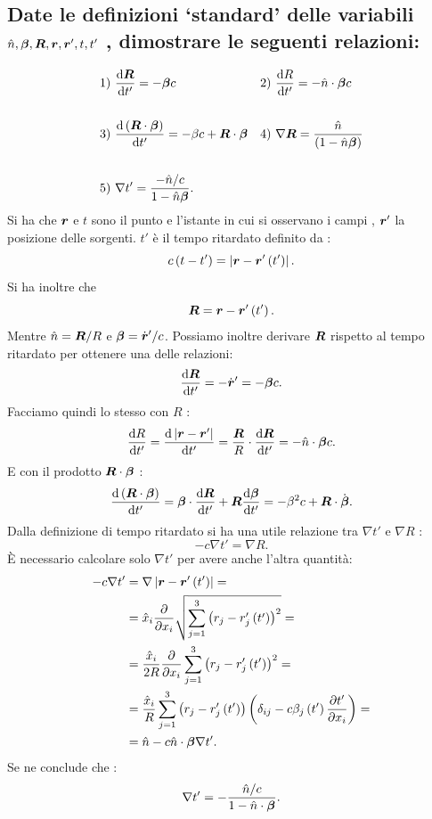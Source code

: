 \subsection[]{Date le definizioni ‘standard’ delle variabili $\hat{n}, \boldsymbol{\beta}, \boldsymbol{R}, \boldsymbol{r}, \boldsymbol{r}', t, t'$ , dimostrare le seguenti relazioni:
} \label{sec:3.b.2}
\begin{align*}
&1) \ \frac{\mbox{d} \bs{R}}{\mbox{d} t'} = -\bs{\beta}c 					&2)& \ \frac{\mbox{d}R}{\mbox{d}t'}=-\hat{n}\cdot\bs{\beta}c\\
& & &\\
&3) \ \frac{\mbox{d}\left(\bs{R}\cdot\bs{\beta}\right)}{\mbox{d}t'}=-\beta c+\bs{R}\cdot\bs{\beta}	&4)& \ \nabla\bs{R}=\frac{\hat{n}}{\left(1-\hat{n}\bs{\beta}\right)}\\
& & &\\
&5) \ \nabla t' = \frac{-\hat{n}/c}{1-\hat{n}\bs{\beta}}
.\end{align*}
Si ha che $\boldsymbol{r}$ e $t$ sono il punto e l'istante in cui si osservano i campi , $\boldsymbol{r}'$ la posizione delle sorgenti. $t'$ è il tempo ritardato definito da : \[
	c\left( t-t' \right) =\left| \boldsymbol{r}- \boldsymbol{r}'\left( t' \right)  \right| 
.\] 
Si ha inoltre che \[
	\boldsymbol{R}= \boldsymbol{r}-\boldsymbol{r}'\left( t' \right) 
.\]
Mentre $\hat{n} = \boldsymbol{R} /R$ e $\boldsymbol{\beta}=\dot{\boldsymbol{r}}' /c$. Possiamo inoltre derivare $\boldsymbol{R}$ rispetto al tempo ritardato per ottenere una delle relazioni: \[
	\frac{\mbox{d} \boldsymbol{R}}{\mbox{d} t'} = -\dot{\boldsymbol{r}}'=-\boldsymbol{\beta}c
.\] 
Facciamo quindi lo stesso con $R$ : \[
	\frac{\mbox{d} R}{\mbox{d} t'} = \frac{\mbox{d} \left| \boldsymbol{r}-\boldsymbol{r}' \right| }{\mbox{d} t'} = 
	\frac{\boldsymbol{R}}{R}\cdot \frac{\mbox{d} \boldsymbol{R}}{\mbox{d} t'}= - \hat{n}\cdot \boldsymbol{\beta}c
.\] 
E con il prodotto $\boldsymbol{R}\cdot \boldsymbol{\beta}$ : \[
	\frac{\mbox{d} \left( \boldsymbol{R}\cdot \boldsymbol{\beta} \right) }{\mbox{d} t'} = \boldsymbol{\beta}\cdot \frac{\mbox{d} \boldsymbol{R}}{\mbox{d} t'} + \boldsymbol{R}\frac{\mbox{d} \boldsymbol{\beta}}{\mbox{d} t'} = -\beta^2c + \boldsymbol{R}\cdot \dot{\boldsymbol{\beta}} 	
.\]
Dalla definizione di tempo ritardato si ha una utile relazione tra $\nabla t'$ e $\nabla R$ : \[
	-c\nabla t' = \nabla R 
.\] 
È necessario calcolare solo $\nabla t'$ per avere anche l'altra quantità:
\begin{align*}
	-c\nabla t' &= \nabla \left| \boldsymbol{r}-\boldsymbol{r}'\left( t' \right)  \right| =\\
		    &= \hat{x}_{i} \frac{\partial }{\partial x_{i} } \sqrt{\sum_{j=1}^{3} \left( r_{j}-r'_{j}\left( t' \right)  \right)^2 }=\\
		    &= \frac{\hat{x}_{i}}{2R} \frac{\partial }{\partial x_{i}} \sum_{j=1}^{3} \left( r_{j}-r'_{j}\left( t' \right)  \right) ^2 = \\
		    &= \frac{\hat{x}_{i}}{R} \sum_{j=1}^{3} \left( r_{j}-r'_{j}\left( t' \right)  \right)
		    \left( \delta_{ij}-c \beta_{j}\left( t' \right) \frac{\partial t'}{\partial x_{i}}  \right) =\\
		    &= \hat{n}- c \hat{n}\cdot \boldsymbol{\beta} \nabla t' 
.\end{align*}
Se ne conclude che : \[
	\nabla t'=-\frac{\hat{n} /c}{1-\hat{n}\cdot \boldsymbol{\beta}}
.\] 

